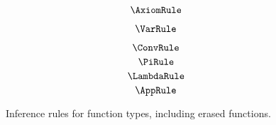 
\begin{figure}
    \centering
    \begin{minipage}{0.5\textwidth}
        $$\AxiomRule$$
    \end{minipage}%
    \begin{minipage}{0.5\textwidth}
        $$\VarRule$$
    \end{minipage}%
    $$\ConvRule$$
    $$\PiRule$$
    $$\LambdaRule$$
    $$\AppRule$$
    \caption{
        Inference rules for function types, including erased functions.
    }
    \label{fig:2:typ1}
\end{figure}
